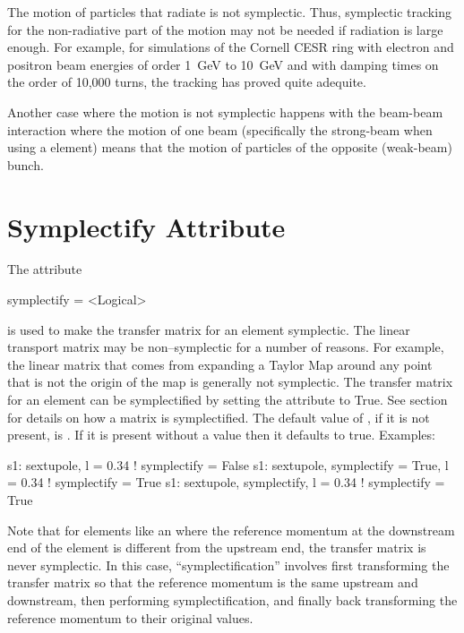 The motion of particles that radiate is not symplectic. Thus, symplectic tracking for the
non-radiative part of the motion may not be needed if radiation is large enough. For example, for
simulations of the Cornell CESR ring with electron and positron beam energies of order 1~GeV to
10~GeV and with damping times on the order of 10,000 turns, the  tracking has
proved quite adequite.

Another case where the motion is not symplectic happens with the beam-beam interaction where the
motion of one beam (specifically the strong-beam when using a  
element) means that the motion of particles of the opposite (weak-beam) bunch.

\section{Symplectify Attribute}
\label{s:symp}

The  attribute
\begin{example}
  symplectify = <Logical>
\end{example}
is used to make the transfer matrix for an element symplectic. The linear transport matrix may be
non--symplectic for a number of reasons.  For example, the linear matrix that comes from expanding a
Taylor Map around any point that is not the origin of the map is generally not symplectic. The
transfer matrix for an element can be symplectified by setting the  attribute to
True. See section~ for details on how a matrix is symplectified. The default
value of , if it is not present, is . If it is present without a value
then it defaults to true. Examples:
\begin{example}
  s1: sextupole, l = 0.34                       ! symplectify = False
  s1: sextupole, symplectify = True, l = 0.34   ! symplectify = True
  s1: sextupole, symplectify, l = 0.34          ! symplectify = True
\end{example}

\label{lcavity} Note that for elements like an  where the
reference momentum at the downstream end of the element is different
from the upstream end, the transfer matrix is never symplectic. In
this case, ``symplectification'' involves first transforming the
transfer matrix so that the reference momentum is the same upstream
and downstream, then performing symplectification, and finally back
transforming the reference momentum to their original values.


